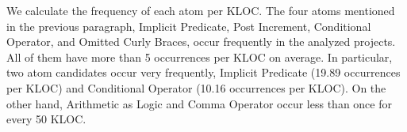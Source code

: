 We calculate the frequency of each atom per KLOC.
The four atoms mentioned in the previous paragraph,
Implicit Predicate, Post Increment, Conditional Operator, and Omitted Curly Braces, occur frequently in the analyzed projects. All of them have more than 5 occurrences per KLOC on average. In particular, two atom candidates occur very frequently, Implicit Predicate (19.89 occurrences per KLOC) and Conditional Operator (10.16 occurrences per KLOC). On the other hand, Arithmetic as Logic and Comma Operator occur less than once for every 50 KLOC. 









 
